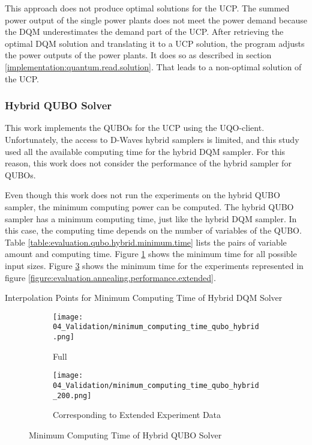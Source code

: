 This approach does not produce optimal solutions for the UCP.
The summed power output of the single power plants does not meet the power demand because the DQM underestimates the demand part of the UCP.
After retrieving the optimal DQM solution and translating it to a UCP solution, the program adjusts the power outputs of the power plants.
It does so as described in section \ref{implementation:quantum.read.solution}.
That leads to a non-optimal solution of the UCP.

\subsubsection{Hybrid QUBO Solver}

This work implements the QUBOs for the UCP using the UQO-client.
Unfortunately, the access to D-Waves hybrid samplers is limited, and this study used all the available computing time for the hybrid DQM sampler.
For this reason, this work does not consider the performance of the hybrid sampler for QUBOs.

Even though this work does not run the experiments on the hybrid QUBO sampler, the minimum computing power can be computed.
The hybrid QUBO sampler has a minimum computing time, just like the hybrid DQM sampler.
In this case, the computing time depends on the number of variables of the QUBO.
Table \ref{table:evaluation.qubo.hybrid.minimum.time} lists the pairs of variable amount and computing time.
Figure \ref{figure:evaluation.qubo.hybrid.minimum.time} shows the minimum time for all possible input sizes.
Figure \ref{figure:evaluation.qubo.hybrid.minimum.time.200} shows the minimum time for the experiments represented in figure \ref{figure:evaluation.annealing.performance.extended}.

\begin{table}[ht]
  \centering
  
  \caption{Interpolation Points for Minimum Computing Time of Hybrid DQM Solver}
  \label{table:evaluation.qubo.hybrid.minimum.time}
\end{table}
\begin{figure} [ht]
  \begin{subfigure}[b]{0.5 \textwidth}
    \centering
    \texttt{[image: 04\_Validation/minimum\_computing\_time\_qubo\_hybrid.png]}
    \caption{Full}
    \label{figure:evaluation.qubo.hybrid.minimum.time}
  \end{subfigure}
  \begin{subfigure}[b]{0.5 \textwidth}
    \centering
    \texttt{[image: 04\_Validation/minimum\_computing\_time\_qubo\_hybrid\_200.png]}
    \caption{Corresponding to Extended Experiment Data}
    \label{figure:evaluation.qubo.hybrid.minimum.time.200}
  \end{subfigure}
  \caption{Minimum Computing Time of Hybrid QUBO Solver}
\end{figure}

